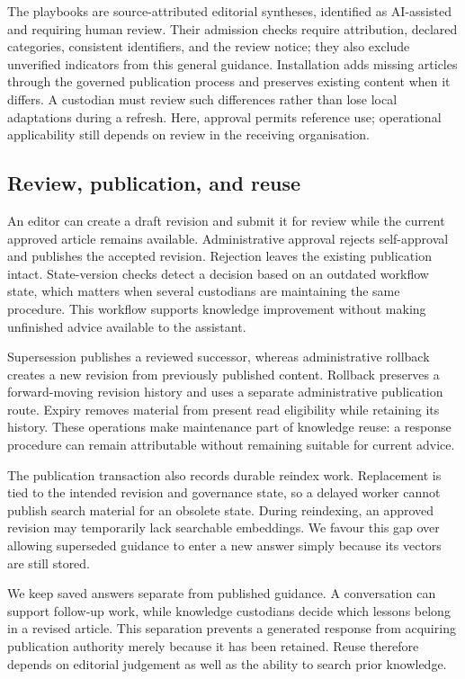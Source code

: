 The playbooks are source-attributed editorial syntheses, identified as AI-assisted and requiring human review. Their admission checks require attribution, declared categories, consistent identifiers, and the review notice; they also exclude unverified indicators from this general guidance. Installation adds missing articles through the governed publication process and preserves existing content when it differs. A custodian must review such differences rather than lose local adaptations during a refresh. Here, approval permits reference use; operational applicability still depends on review in the receiving organisation.

\subsection{Review, publication, and reuse}

An editor can create a draft revision and submit it for review while the current approved article remains available. Administrative approval rejects self-approval and publishes the accepted revision. Rejection leaves the existing publication intact. State-version checks detect a decision based on an outdated workflow state, which matters when several custodians are maintaining the same procedure. This workflow supports knowledge improvement without making unfinished advice available to the assistant.

Supersession publishes a reviewed successor, whereas administrative rollback creates a new revision from previously published content. Rollback preserves a forward-moving revision history and uses a separate administrative publication route. Expiry removes material from present read eligibility while retaining its history. These operations make maintenance part of knowledge reuse: a response procedure can remain attributable without remaining suitable for current advice.

The publication transaction also records durable reindex work. Replacement is tied to the intended revision and governance state, so a delayed worker cannot publish search material for an obsolete state. During reindexing, an approved revision may temporarily lack searchable embeddings. We favour this gap over allowing superseded guidance to enter a new answer simply because its vectors are still stored.

We keep saved answers separate from published guidance. A conversation can support follow-up work, while knowledge custodians decide which lessons belong in a revised article. This separation prevents a generated response from acquiring publication authority merely because it has been retained. Reuse therefore depends on editorial judgement as well as the ability to search prior knowledge.

